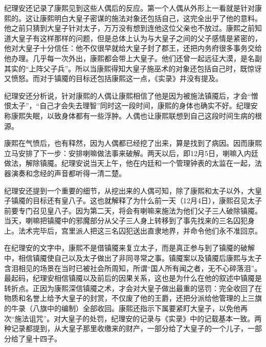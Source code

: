 纪理安还记录了康熙见到这些人偶后的反应。第一个人偶从外形上一看就是针对康熙的。这让康熙明白大皇子密谋的施法对象还包括自己，这完全出乎了他的意料。他之前只猜到大皇子针对太子，万万没有想到连他这位父亲也不放过。康熙之前知道大皇子有这样那样的问题，但是总体上认为与大皇子之间的父子感情是紧密的，他对大皇子十分信任：他不仅很早就给大皇子封了郡王，还把内务府很多事务交给他办理。几乎每一次外出，康熙都会带上大皇子。他们还曾一起远征大漠，是名副其实的“上阵父子兵”。所以当康熙得知大皇子施巫术的对象还包括自己时，既惊讶又愤怒。而对于镇魇的目标还包括康熙这一点，《实录》并没有提及。



纪理安还分析说，针对康熙的人偶让康熙相信了他是因为被施法镇魇后，才会“憎恨太子”，“自己才会失去理智”同时这一段时间，康熙的身体也确实不好。纪理安称康熙失眠，以致身体都有一些浮肿。人偶也让康熙联想到自己这段时间生病的根源。



康熙在气愤后，也有释然，因为人偶都已经挖了出来，算是找到了病因。因而康熙立马安排了下一步：安排喇嘛做法事来破解。两天以后，即12月5日，喇嘛入内廷做法，解除镇魇。纪理安说当天上午，他在内廷和一个管理钟表的太监在一起，法器演奏和念经的声音都听得一清二楚。



纪理安还提到一个重要的细节，从挖出来的人偶可知，除了康熙和太子以外，大皇子镇魇的目标还有皇八子。这也就解释了为什么前一天（12月4日），康熙召见太子前要专门召见皇八子。因为第二天，将会有喇嘛来施法为他们父子三人破除镇魇。当天，喇嘛把镇魇中的邪魔部分从父子三人身上转移到了事先找来的三名囚犯身上。法术完毕后，宫里派人把这三名囚犯送出直隶地界，并命令他们永不准回京。



在纪理安的文字中，康熙不是借镇魇来复立太子，而是真正参与到了镇魇的破解中，相信镇魇使自己以及太子做出了非同寻常之事。镇魇案以及镇魇后康熙与太子含泪相见的场景在当时已被社会所周知，所谓“国人所有闻之者，无不心碎落泪”。最起码，纪理安相信镇魇以及前后的因果关系，这也是为什么在他的叙述中镇魇是转折点。正因为康熙深信镇魇之术，才会对大皇子做出最重的惩罚：完全收回了在物质和名誉上给予大皇子的封赏，不仅废了他的王爵，还把分派给他管理的上三旗的牛录（八旗中的编制）全部收回。康熙还指示下属要紧盯大皇子，以免他再次“施法诅咒”。对大皇子的处罚，纪理安的记录与《实录》中的记载基本一致。两种记录都提到，从大皇子那里收缴来的财产，一部分给了大皇子的一个儿子，一部分给了皇十四子。


